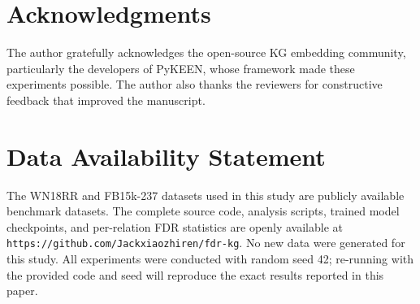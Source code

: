 \documentclass[review]{elsarticle}
\begin{document}







\section*{Acknowledgments}
The author gratefully acknowledges the open-source KG embedding community, particularly the developers of PyKEEN, whose framework made these experiments possible. The author also thanks the reviewers for constructive feedback that improved the manuscript.

\section*{Data Availability Statement}
The WN18RR and FB15k-237 datasets used in this study are publicly available benchmark datasets. The complete source code, analysis scripts, trained model checkpoints, and per-relation FDR statistics are openly available at \texttt{https://github.com/Jackxiaozhiren/fdr-kg}. No new data were generated for this study. All experiments were conducted with random seed 42; re-running with the provided code and seed will reproduce the exact results reported in this paper.



\end{document}
